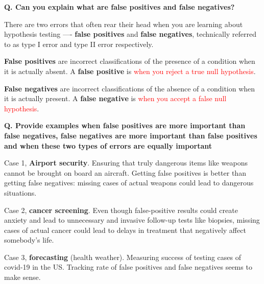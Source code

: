 \begin{frame}[fragile]{\textbf{Q. Can you explain what are false positives and false negatives?}}
  \begin{wideitemize}
  \item There are two errors that often rear their head when you are learning
    about hypothesis testing —- \textbf{false positives} and \textbf{false negatives}, technically
    referred to as type I error and type II error respectively.
  \item \textbf{False positives} are incorrect classifications of the presence
    of a condition when it is actually absent. A \textbf{false positive} is \textcolor{red}{when you
      reject a true null hypothesis}.
  \item \textbf{False negatives} are incorrect classifications of the absence of
    a condition when it is actually present. A \textbf{false negative} is \textcolor{red}{when you accept
      a false null hypothesis}.
  \end{wideitemize}
\end{frame}

\begin{frame}[fragile]{\textbf{Q. Provide examples when false positives are more
      important than false negatives, false negatives are more important than
      false positives and when these two types of errors are equally important}}
  \begin{wideitemize}
    \item Case 1, \textbf{Airport security}. Ensuring that truly dangerous items like
    weapons cannot be brought on board an aircraft. Getting false positives is better than
    getting false negatives: missing cases of actual weapons could lead to dangerous situations.
  \item Case 2, \textbf{cancer screening}. Even though false-positive results could create
  anxiety and lead to unnecessary and invasive follow-up tests like biopsies, missing cases of
  actual cancer could lead to delays in treatment that negatively affect somebody's life.
  \item Case 3, \textbf{forecasting} (health weather). Measuring success of testing cases
  of covid-19 in the US. Tracking rate of false positives and false negatives seems to make sense.
  \end{wideitemize}
\end{frame}

